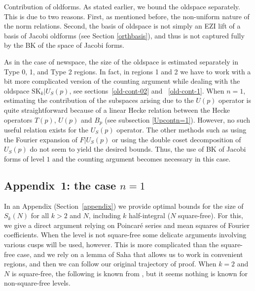 \documentclass[11pt]{amsart}
\makeatletter
\numberwithin{equation}{section}
\renewcommand\subsubsection{\@secnumfont}{\bfseries}%
\renewcommand\subsubsection{\@startsection{subsubsection}{3}
  \z@{.5\linespacing\@plus.7\linespacing}{-.5em}%
  {\normalfont\bfseries}}
\theoremstyle{plain}
\theoremstyle{definition}
\newcommand{\mrm}{\mathrm}
\newcommand{\skk}{\mrm{SK}_k}
\makeatother
\begin{document}
\subsubsection{Contribution of oldforms.} As stated earlier, we bound the oldspace separately. This is due to two reasons. First, as mentioned before, the non-uniform nature of the norm relations. Second, the basis of oldspace is not simply an EZI lift of a basis of Jacobi oldforms (see Section \ref{orthbasis}), and thus is not captured fully by the BK of the space of Jacobi forms.

As in the case of newspace, the size of the oldspace is estimated separately in Type 0, 1, and Type 2 regions. In fact, in regions 1 and 2 we have to work with a bit more complicated version of the counting argument while dealing with the oldspace $\skk|U_S(p)$, see sections~\ref{old-cont-02} and ~\ref{old-cont-1}. When $n=1$, estimating the contribution of the subspaces arising due to the $U(p)$ operator is quite straightforward because of a linear Hecke relation between the Hecke operators $T(p)$, $U(p)$ and $B_p$ (see subsection \ref{Upcontn=1}). However, no such useful relation exists for the $U_S(p)$ operator. The other methods such as using the Fourier expansion of $F|U_S(p)$ or using the double coset decomposition of $U_S(p)$ do not seem to yield the desired bounds. Thus, the use of BK of Jacobi forms of level $1$ and the counting argument becomes necessary in this case.


\subsection{\texorpdfstring{Appendix~1: the case $n=1$}{Appendix: the case n=1}} \label{intro-app}

In an Appendix (Section~\ref{appendix}) we provide optimal bounds for the size of $S_k(N)$ for all $k > 2$ and $N$, including $k$ half-integral ($N$ square-free). For this, we give a direct argument relying on Poincar\'e series and mean squares of Fourier coefficients. 
When the level is not square-free some delicate arguments involving various cusps will be used, however.
This is more complicated than the square-free case, and we rely on a lemma of Saha \cite{saha2017sup} that allows us to work in convenient regions, and then we can follow our original trajectory of proof. When $k=2$ and $N$ is square-free, the following is known from \cite{jorgenson2004bounding}, but it seems nothing is known for non-square-free levels.
\end{document}
